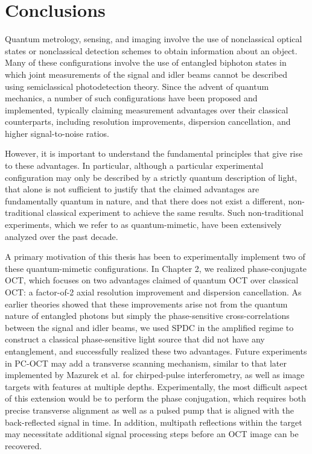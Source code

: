 \chapter{Conclusions}

Quantum metrology, sensing, and imaging involve the use of nonclassical optical states or nonclassical detection schemes to obtain information about an object. Many of these configurations involve the use of entangled biphoton states in which joint measurements of the signal and idler beams cannot be described using semiclassical photodetection theory. Since the advent of quantum mechanics, a number of such configurations have been proposed and implemented, typically claiming measurement advantages over their classical counterparts, including resolution improvements, dispersion cancellation, and higher signal-to-noise ratios.

However, it is important to understand the fundamental principles that give rise to these advantages. In particular, although a particular experimental configuration may only be described by a strictly quantum description of light, that alone is not sufficient to justify that the claimed advantages are fundamentally quantum in nature, and that there does not exist a different, non-traditional classical experiment to achieve the same results. Such non-traditional experiments, which we refer to as quantum-mimetic, have been extensively analyzed over the past decade.

A primary motivation of this thesis has been to experimentally implement two of these quantum-mimetic configurations. In Chapter 2, we realized phase-conjugate OCT, which focuses on two advantages claimed of quantum OCT over classical OCT: a factor-of-2 axial resolution improvement and dispersion cancellation. As earlier theories showed that these improvements arise not from the quantum nature of entangled photons but simply the phase-sensitive cross-correlations between the signal and idler beams, we used SPDC in the amplified regime to construct a classical phase-sensitive light source that did not have any entanglement, and successfully realized these two advantages. Future experiments in PC-OCT may add a transverse scanning mechanism, similar to that later implemented by Mazurek et al. \cite{mazurek-dispersion} for chirped-pulse interferometry, as well as image targets with features at multiple depths. Experimentally, the most difficult aspect of this extension would be to perform the phase conjugation, which requires both precise transverse alignment as well as a pulsed pump that is aligned with the back-reflected signal in time. In addition, multipath reflections within the target may necessitate additional signal processing steps before an OCT image can be recovered.

